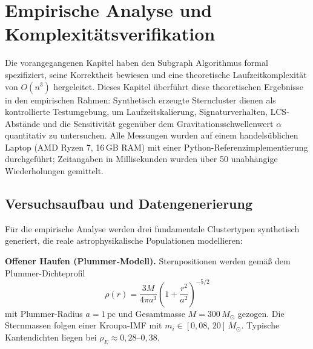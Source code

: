 ﻿\documentclass[a4paper,12pt]{report}
\theoremstyle{definition}
\begin{document}
\chapter{Empirische Analyse und Komplexitätsverifikation}
\label{chap:empirie}

Die vorangegangenen Kapitel haben den Subgraph Algorithmus formal spezifiziert, seine Korrektheit bewiesen und eine theoretische Laufzeitkomplexität von $O(n^3)$ hergeleitet. Dieses Kapitel überführt diese theoretischen Ergebnisse in den empirischen Rahmen: Synthetisch erzeugte Sterncluster dienen als kontrollierte Testumgebung, um Laufzeitskalierung, Signaturverhalten, LCS-Abstände und die Sensitivität gegenüber dem Gravitationsschwellenwert $\alpha$ quantitativ zu untersuchen. Alle Messungen wurden auf einem handelsüblichen Laptop (AMD Ryzen 7, 16\,GB RAM) mit einer Python-Referenzimplementierung durchgeführt; Zeitangaben in Millisekunden wurden über 50 unabhängige Wiederholungen gemittelt.

\section{Versuchsaufbau und Datengenerierung}
\label{sec:empirie_aufbau}

Für die empirische Analyse werden drei fundamentale Clustertypen synthetisch generiert, die reale astrophysikalische Populationen modellieren:

\textbf{Offener Haufen (Plummer-Modell).} Sternpositionen werden gemäß dem Plummer-Dichteprofil
\[
    \rho(r) = \frac{3M}{4\pi a^3}\left(1 + \frac{r^2}{a^2}\right)^{-5/2}
\]
mit Plummer-Radius $a = 1\,\mathrm{pc}$ und Gesamtmasse $M = 300\,M_\odot$ gezogen. Die Sternmassen folgen einer Kroupa-IMF mit $m_i \in [0{,}08,\,20]\,M_\odot$. Typische Kantendichten liegen bei $\rho_E \approx 0{,}28$--$0{,}38$.
\end{document}
